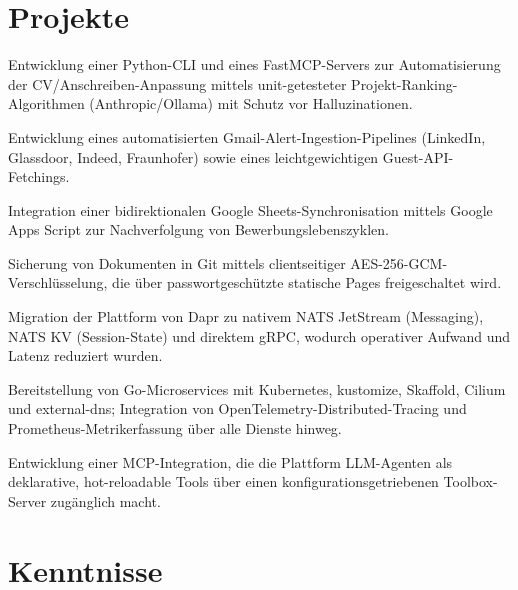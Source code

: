 \documentclass[10pt,a4paper]{resume}
\begin{document}
\section{Projekte}

\bullets
  \item Entwicklung einer Python-CLI und eines FastMCP-Servers zur Automatisierung der CV/Anschreiben-Anpassung mittels unit-getesteter Projekt-Ranking-Algorithmen (Anthropic/Ollama) mit Schutz vor Halluzinationen.
  \item Entwicklung eines automatisierten Gmail-Alert-Ingestion-Pipelines (LinkedIn, Glassdoor, Indeed, Fraunhofer) sowie eines leichtgewichtigen Guest-API-Fetchings.
  \item Integration einer bidirektionalen Google Sheets-Synchronisation mittels Google Apps Script zur Nachverfolgung von Bewerbungslebenszyklen.
  \item Sicherung von Dokumenten in Git mittels clientseitiger AES-256-GCM-Verschlüsselung, die über passwortgeschützte statische Pages freigeschaltet wird.
\bulletsend
\vspace{1.0pt}
\bullets
  \item Migration der Plattform von Dapr zu nativem NATS JetStream (Messaging), NATS KV (Session-State) und direktem gRPC, wodurch operativer Aufwand und Latenz reduziert wurden.
  \item Bereitstellung von Go-Microservices mit Kubernetes, kustomize, Skaffold, Cilium und external-dns; Integration von OpenTelemetry-Distributed-Tracing und Prometheus-Metrikerfassung über alle Dienste hinweg.
  \item Entwicklung einer MCP-Integration, die die Plattform LLM-Agenten als deklarative, hot-reloadable Tools über einen konfigurationsgetriebenen Toolbox-Server zugänglich macht.
\bulletsend

\section{Kenntnisse}
\end{document}
